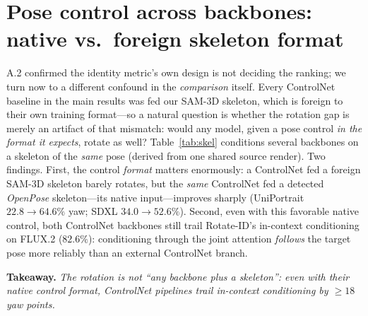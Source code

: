 \section{Pose control across backbones: native vs.\ foreign skeleton format}
\label{sec:exp_skel}
A.2 confirmed the identity metric's own design is not deciding the ranking;
we turn now to a different confound in the \emph{comparison} itself. Every
ControlNet baseline in the main results was fed our SAM-3D skeleton, which is
foreign to their own training format---so a natural question is whether the
rotation gap is merely an artifact of that mismatch: would any model, given a
pose control \emph{in the format it expects}, rotate as well?
Table~\ref{tab:skel} conditions several backbones on a skeleton of the
\emph{same} pose (derived from one shared source render). Two findings. First,
the control \emph{format} matters enormously: a ControlNet fed a foreign SAM-3D
skeleton barely rotates, but the \emph{same} ControlNet fed a detected
\emph{OpenPose} skeleton---its native input---improves sharply (UniPortrait
$22.8\!\rightarrow\!64.6\%$ yaw; SDXL $34.0\!\rightarrow\!52.6\%$). Second, even
with this favorable native control, both ControlNet backbones still trail
Rotate-ID's in-context conditioning on FLUX.2 ($82.6\%$): conditioning through the
joint attention \emph{follows} the target pose more reliably than an external
ControlNet branch.

\noindent\textbf{Takeaway.} \emph{The rotation is not ``any backbone plus a
skeleton'': even with their native control format, ControlNet pipelines trail
in-context conditioning by ${\ge}18$ yaw points.}

\begin{table}[t]\centering\small
\setlength{\tabcolsep}{4pt}
\caption[Following a pose control across backbones]{\textbf{Following a pose control across backbones} (\%; $1400$ images
each). Each ControlNet
backbone is given a detected OpenPose skeleton of the same pose---its \emph{native}
input. Native-format control lifts the ControlNets sharply (cf.\ a foreign SAM-3D
skeleton: UniPortrait $22.8\%$, SDXL $34.0\%$ yaw), yet all trail Rotate-ID's
in-context conditioning.}
\label{tab:skel}
\end{table}

